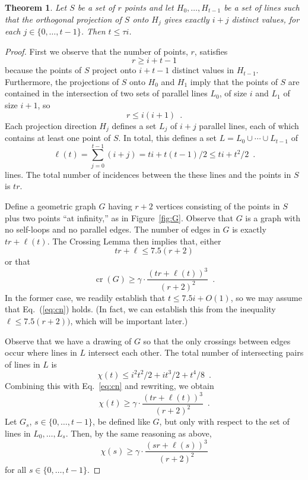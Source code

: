 \documentclass[12pt]{article}
\newtheorem{thm}{Theorem}
\DeclareMathOperator{\cn}{cr}
\begin{document}
\begin{thm}
Let $S$ be a set of $r$ points and let $H_0,\ldots,H_{t-1}$ be a
set of lines such that the orthogonal projection of $S$ onto $H_{j}$
gives exactly $i+j$ distinct values, for each $j\in\{0,\ldots,t-1\}$.
Then $t \le \tau i$.
\end{thm}

\begin{proof}
First we observe that the number of points, $r$, satisfies 
\[   r \ge i+t-1 
\]
because the points of $S$ project onto $i+t-1$ distinct values in $H_{t-1}$.  Furthermore, the projections of $S$ onto $H_0$ and $H_1$ imply that the points of $S$ are contained in the intersection of two sets of parallel lines $L_0$, of size $i$ and $L_1$ of size $i+1$, so
\[
   r \le i(i+1) \enspace .
\]
Each projection direction $H_j$ defines a set $L_j$ of $i+j$ parallel lines,
each of which contains at least one point of $S$.  In total, this defines
a set $L=L_0\cup\cdots\cup L_{t-1}$ of
\[
   \ell(t) = \sum_{j=0}^{t-1} (i+j) = ti + t(t-1)/2 \le ti + t^2/2 \enspace .
\]
lines.  The total number of incidences between the these lines and
the points in $S$ is $tr$.

Define a geometric graph $G$ having $r+2$ vertices consisting
of the points in $S$ plus two points ``at infinity,'' as in
Figure~\ref{fig:G}. Observe that $G$ is a graph with no self-loops and no
parallel edges. The number of
edges in $G$ is exactly $tr + \ell(t)$.
The Crossing Lemma \cite{XX} then implies that, either
\[
  tr +\ell \le 7.5(r+2)
\]
or that
\begin{equation}
  \cn(G) \ge \gamma\cdot\frac{(tr+\ell(t))^3}{(r+2)^2} \enspace . \label{eq:cn}
\end{equation}
In the former case, we readily establish that $t \le 7.5i + O(1)$,
so we may assume that Eq.~(\ref{eq:cn}) holds.  (In fact, we can establish this from the inequality $\ell \le 7.5(r+2))$, which will be important later.)

Observe that we have a drawing of $G$ so that the only crossings between
edges occur where lines in $L$ intersect each other.  The total number of intersecting pairs of lines in $L$ is 
\[
  \chi(t) \le i^2t^2/2 + it^3/2 + t^4/8 \enspace .
\]
Combining this with Eq.~\ref{eq:cn} and rewriting, we obtain 
\[
  \chi(t)  \ge \gamma\cdot\frac{(tr+\ell(t))^3}{(r+2)^2} \enspace .
\]
Let $G_{s}$, $s\in\{0,\ldots,t-1\}$, be defined like $G$, but only with respect to the set of lines in $L_0,\ldots,L_s$.  Then, by the same reasoning as above,
\[
  \chi(s) \ge \gamma\cdot\frac{(sr+\ell(s))^3}{(r+2)^2} 
\]
for all $s\in\{0,\ldots,t-1\}$.


\end{proof}
\end{document}
